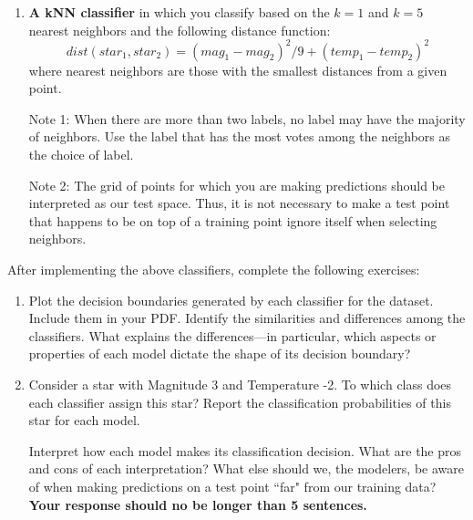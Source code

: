 \documentclass[submit]{harvardml}
\begin{document}
\begin{problem}
\begin{enumerate}[label=\alph*)]
\item \textbf{A kNN classifier} in which you classify based on the $k = 1$ and $k = 5$ nearest neighbors and the following distance function: $$dist(star_1, star_2) = (mag_1 - mag_2)^2/9 + (temp_1 - temp_2)^2$$
where nearest neighbors are those with the smallest distances from a given point.

  Note 1: When there are more than two labels, no label may have the
  majority of neighbors.  Use the label that has the most votes among
  the neighbors as the choice of label. 

  Note 2: The grid of points for which you are making predictions
  should be interpreted as our test space.  Thus, it is not necessary
  to make a test point that happens to be on top of a training point
  ignore itself when selecting neighbors.

\end{enumerate}

After implementing the above classifiers, complete the following exercises:

\begin{enumerate}
    \item Plot the decision boundaries generated by each classifier for the dataset. Include them in your PDF. 
    Identify the similarities and differences among the classifiers. What explains the differences---in particular, which aspects or properties of each model dictate the shape of its decision boundary? 
    
    \item 
    
    Consider a star with Magnitude 3 and Temperature -2. To which class does each classifier assign this star? Report the classification probabilities of this star for each model. 
    
    Interpret how each model makes its classification decision. What are the pros and cons of each interpretation? What else should we, the modelers, be aware of when making predictions on a test point ``far" from our training data? \textbf{Your response should no be longer than 5 sentences.}
\end{enumerate}
\end{problem}
\end{document}
